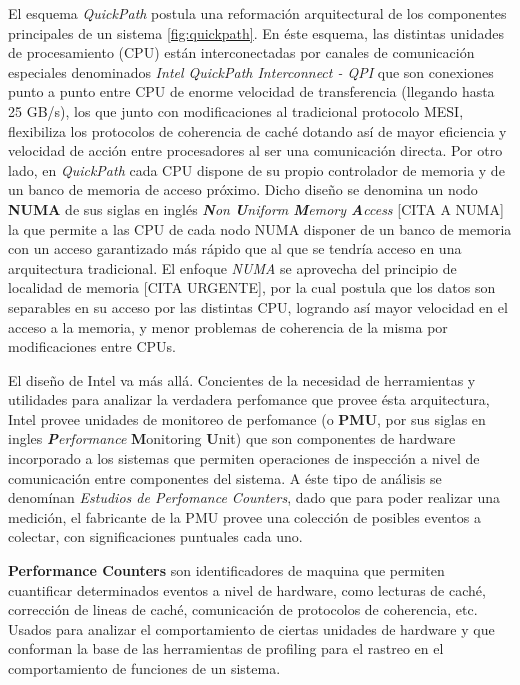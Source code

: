 El esquema \emph{QuickPath} postula una reformación arquitectural de los componentes principales de un sistema \ref{fig:quickpath}. En éste esquema, las distintas unidades de procesamiento (CPU) están interconectadas por canales de comunicación especiales denominados \emph{Intel QuickPath Interconnect - QPI} que son conexiones punto a punto entre CPU de enorme velocidad de transferencia (llegando hasta 25 GB/s), los que junto con modificaciones al tradicional protocolo MESI, flexibiliza los protocolos de coherencia de caché dotando así de mayor eficiencia y velocidad de acción entre procesadores al ser una comunicación directa.
Por otro lado, en \emph{QuickPath} cada CPU dispone de su propio controlador de memoria y de un banco de memoria de acceso próximo. Dicho diseño se denomina un nodo \textbf{NUMA} de sus siglas en inglés \emph{\textbf{N}on \textbf{U}niform \textbf{M}emory \textbf{A}ccess} [CITA A NUMA] la que permite a las CPU de cada nodo NUMA disponer de un banco de memoria con un acceso garantizado más rápido que al que se tendría acceso en una arquitectura tradicional. El enfoque \emph{NUMA} se aprovecha del principio de localidad de memoria [CITA URGENTE], por la cual postula que los datos son separables en su acceso por las distintas CPU, logrando así mayor velocidad en el acceso a la memoria, y menor problemas de coherencia de la misma por modificaciones entre CPUs.

El diseño de Intel va más allá. Concientes de la necesidad de herramientas y utilidades para analizar la verdadera perfomance que provee ésta arquitectura, Intel provee unidades de monitoreo de perfomance (o \textbf{PMU}, por sus siglas en ingles \emph{\textbf{P}erformance} \textbf{M}onitoring \textbf{U}nit) que son componentes de hardware incorporado a los sistemas que permiten operaciones de inspección a nivel de comunicación entre componentes del sistema. A éste tipo de análisis se denomínan \emph{Estudios de Perfomance Counters}, dado que para poder realizar una medición, el fabricante de la PMU provee una colección de posibles eventos a colectar, con significaciones puntuales cada uno.

\begin{defn} \textbf{Performance Counters} son identificadores de maquina que permiten cuantificar determinados eventos a nivel de hardware, como lecturas de caché, corrección de lineas de caché, comunicación de protocolos de coherencia, etc. Usados para analizar el comportamiento de ciertas unidades de hardware y que conforman la base de las herramientas de profiling para el rastreo en el comportamiento de funciones de un sistema.
\end{defn}
 
